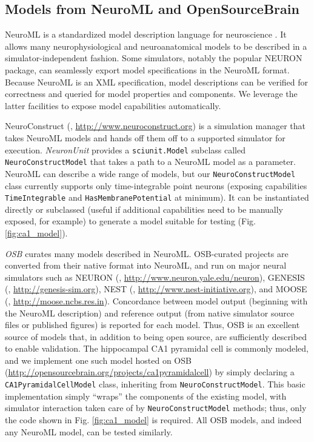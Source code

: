 \documentclass{frontiersSCNS}
\let\verbx\lstinline
\begin{document}
\subsection{Models from NeuroML and OpenSourceBrain}\label{sec:neuroml_models}
NeuroML is a standardized model description language for neuroscience \citep{gleeson_neuroml:_2010}. 
It allows many neurophysiological and neuroanatomical models to be described in a simulator-independent fashion. Some simulators, notably the popular NEURON package, can seamlessly export model specifications in the NeuroML format. 
Because NeuroML is an XML specification, model descriptions can be verified for correctness and queried for model properties and components. We leverage the latter facilities to expose model capabilities automatically. %

NeuroConstruct (\cite{gleeson_neuroconstruct:_2007}, \url{http://www.neuroconstruct.org}) is a simulation manager that takes NeuroML models and hands off them off to a supported simulator for execution. 
\textit{NeuronUnit} provides a \verbx{sciunit.Model} subclass called \verbx{NeuroConstructModel} that takes a path to a NeuroML model as a parameter.  
NeuroML can describe a wide range of models, but our \verbx{NeuroConstructModel} class currently supports only  time-integrable point neurons (exposing capabilities \verbx{TimeIntegrable} and \verbx{HasMembranePotential} at minimum). 
It can be instantiated directly or subclassed (useful if additional capabilities need to be manually exposed, for example) to generate a model suitable for testing (Fig. \ref{fig:ca1_model}). 

\textit{OSB} curates many models described in NeuroML. 
OSB-curated projects are converted from their native format into NeuroML, and run on major neural simulators such as NEURON (\cite{carnevale_neuron_2006}, \url{http://www.neuron.yale.edu/neuron}), GENESIS (\cite{bower_genesis_2007}, \url{http://genesis-sim.org}), NEST (\cite{gewaltig_nest_2007}, \url{http://www.nest-initiative.org}), and MOOSE (\cite{ray_moose_2008}, \url{http://moose.ncbs.res.in}). 
Concordance between model output (beginning with the NeuroML description) and reference output (from native simulator source files or published figures) is reported for each model. 
Thus, OSB is an excellent source of models that, in addition to being open source, are sufficiently described to enable validation. 
The hippocampal CA1 pyramidal cell is commonly modeled, and we implement one such model hosted on OSB (\url{http://opensourcebrain.org/projects/ca1pyramidalcell}) by simply declaring a \verbx{CA1PyramidalCellModel} class, inheriting from \verbx{NeuroConstructModel}.  
This basic implementation simply ``wraps'' the components of the existing model, with simulator interaction taken care of by \verbx{NeuroConstructModel} methods; 
thus, only the code shown in Fig. \ref{fig:ca1_model} is required. 
All OSB models, and indeed any NeuroML model, can be tested similarly. 
\end{document}
